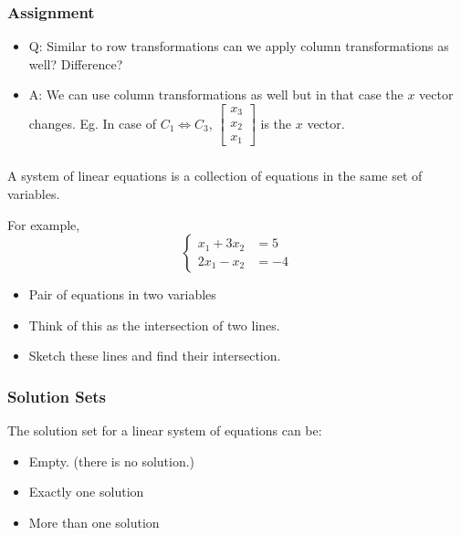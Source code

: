   \begin{frame}[fragile]\frametitle{Assignment}
\begin{itemize}
\item Q: Similar to row transformations can we apply column transformations as well? Difference?
\item A: We can use column transformations as well but in that case the $x$ vector changes. Eg. In case of $C_1 \Longleftrightarrow C_3$, $\left[
\begin{array}{c}
x_3 \\ x_2\\ x_1
\end{array} 
\right]$ is the $x$ vector.
\end{itemize}
\end{frame}

  \begin{frame}[fragile]\frametitle{}
A system of linear equations is a collection of equations in the same set of variables. 

 For example,
\begin{equation*}
\begin{cases}
 x_1 + 3 x_2 &=5\\
 2x_1 -x_2 &= -4
\end{cases}
\end{equation*}

\begin{itemize}
\item Pair of equations in two variables
\item Think of this as the intersection of two lines.
 \item Sketch these lines and find their intersection.
\end{itemize}
\end{frame}

  \begin{frame}[fragile] \frametitle{Solution Sets} 
The solution set for a linear system of equations can be:

\begin{itemize}
 \item Empty. (there is no solution.)
 \item Exactly one solution
 \item More than one solution
\end{itemize}

\end{frame}

